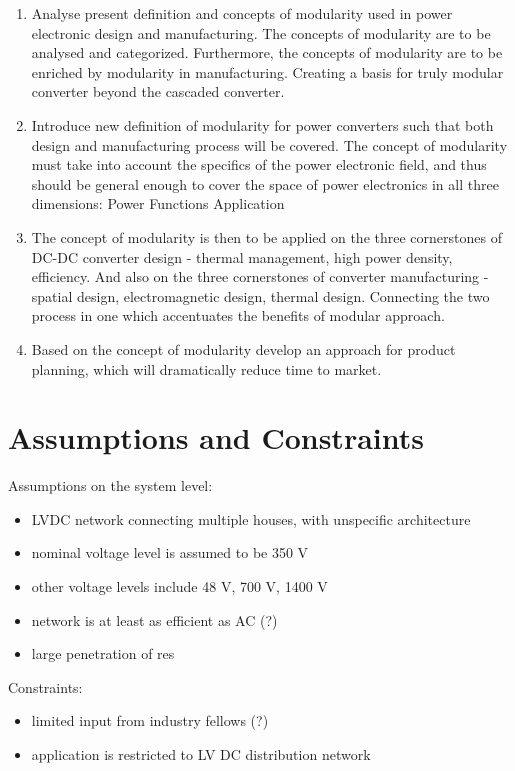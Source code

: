\documentclass[]{scrreprt}
\begin{document}
\begin{enumerate}
	\item Analyse present definition and concepts of modularity used in power electronic design and manufacturing. The concepts of modularity are to be analysed and categorized. Furthermore, the concepts of modularity are to be enriched by modularity in manufacturing. Creating a basis for truly modular converter beyond the cascaded converter. 
	\item Introduce new definition of modularity for power converters such that both design and manufacturing process will be covered. The concept of modularity must take into account the specifics of the power electronic field, and thus should be general enough to cover the space of power electronics in all three dimensions:
	\subitem Power 
	\subitem Functions
	\subitem Application
	\item The concept of modularity is then to be applied on the three cornerstones of DC-DC converter design - thermal management, high power density, efficiency. And also on the three cornerstones of converter manufacturing - spatial design, electromagnetic design, thermal design. Connecting the two process in one which accentuates the benefits of modular approach.
	\item Based on the concept of modularity develop an approach for product planning, which will dramatically reduce time to market. 
\end{enumerate}

\newpage
\section{Assumptions and Constraints}

Assumptions on the system level:
\begin{itemize}
	\item LVDC network connecting multiple houses, with unspecific architecture 
	\item nominal voltage level is assumed to be 350 V
	\item other voltage levels include 48 V, 700 V, 1400 V
	\item network is at least as efficient as AC (?)
	\item large penetration of res
\end{itemize}

Constraints:
\begin{itemize}
	\item limited input from industry fellows (?)
	\item application is restricted to LV DC distribution network
\end{itemize}
\end{document}
